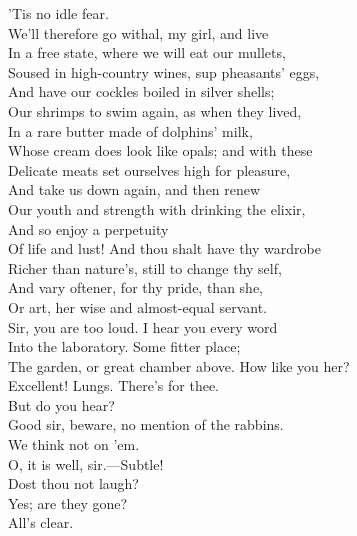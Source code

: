 \documentclass[a4paper,oneside,12pt]{memoir}
\begin{document}
\begin{drama*}
\mammonspeaks {} 'Tis no idle fear.\\
We'll therefore go withal, my girl, and live\\
In a free state, where we will eat our mullets,\\
Soused in high-country wines, sup pheasants' eggs,\\
And have our cockles boiled in silver shells;\\
Our shrimps to swim again, as when they lived,\\
In a rare butter made of dolphins' milk,\\
Whose cream does look like opals; and with these\\
Delicate meats set ourselves high for pleasure,\\
And take us down again, and then renew\\
Our youth and strength with drinking the elixir,\\
And so enjoy a perpetuity\\
Of life and lust! And thou shalt have thy wardrobe\\
Richer than nature's, still to change thy self,\\
And vary oftener, for thy pride, than she,\\
Or art, her wise and almost-equal servant.\\
\facespeaks Sir, you are too loud. I hear you every word\\
Into the laboratory. Some fitter place;\\
The garden, or great chamber above. How like you her?\\
\mammonspeaks Excellent! Lungs. There's for thee.\\
\facespeaks {} But do you hear?\\
Good sir, beware, no mention of the rabbins.\\
\mammonspeaks We think not on 'em.\\
\facespeaks {} O, it is well, sir.---Subtle!\\
Dost thou not laugh?\\
\subtlespeaks {} Yes; are they gone?\\
\facespeaks {} All's clear.\\


\end{drama*}
\end{document}
